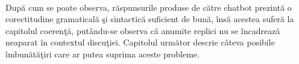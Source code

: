 \paragraph{}
Dup\u a cum se poate observa, r\u aspunsurile produse de c\u atre chatbot prezint\u a o corectitudine gramatical\u a \c si sintactic\u a suficient de bun\u a, \^ ins\u a acestea sufer\u a la capitolul coeren\c t\u a, put\^ andu-se observa c\u a anumite replici nu se \^ incadreaz\u a neaparat \^ in contextul discu\c tiei. Capitolul urm\u ator descrie c\^ ateva posibile \^ imbun\u at\u a\c tiri care ar putea suprima aceste probleme.


